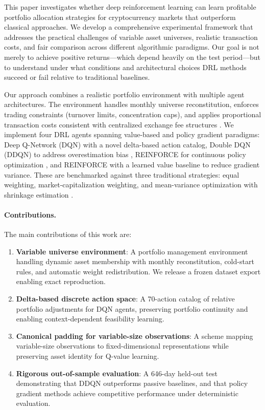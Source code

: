 This paper investigates whether deep reinforcement learning can learn profitable portfolio allocation strategies for cryptocurrency markets that outperform classical approaches. We develop a comprehensive experimental framework that addresses the practical challenges of variable asset universes, realistic transaction costs, and fair comparison across different algorithmic paradigms. Our goal is not merely to achieve positive returns---which depend heavily on the test period---but to understand under what conditions and architectural choices DRL methods succeed or fail relative to traditional baselines.

Our approach combines a realistic portfolio environment with multiple agent architectures. The environment handles monthly universe reconstitution, enforces trading constraints (turnover limits, concentration caps), and applies proportional transaction costs consistent with centralized exchange fee structures \cite{brauneis2022fees}. We implement four DRL agents spanning value-based and policy gradient paradigms: Deep Q-Network (DQN) with a novel delta-based action catalog, Double DQN (DDQN) to address overestimation bias \cite{vanHasselt2016ddqn}, REINFORCE for continuous policy optimization \cite{williams1992reinforce}, and REINFORCE with a learned value baseline to reduce gradient variance. These are benchmarked against three traditional strategies: equal weighting, market-capitalization weighting, and mean-variance optimization with shrinkage estimation \cite{ledoit2004honey}.

\paragraph{Contributions.} The main contributions of this work are:
\begin{enumerate}[leftmargin=*]
    \item \textbf{Variable universe environment}: A portfolio management environment handling dynamic asset membership with monthly reconstitution, cold-start rules, and automatic weight redistribution. We release a frozen dataset export enabling exact reproduction.
    
    \item \textbf{Delta-based discrete action space}: A 70-action catalog of relative portfolio adjustments for DQN agents, preserving portfolio continuity and enabling context-dependent feasibility learning.
    
    \item \textbf{Canonical padding for variable-size observations}: A scheme mapping variable-size observations to fixed-dimensional representations while preserving asset identity for Q-value learning.
    
    \item \textbf{Rigorous out-of-sample evaluation}: A 646-day held-out test demonstrating that DDQN outperforms passive baselines, and that policy gradient methods achieve competitive performance under deterministic evaluation.
\end{enumerate}

